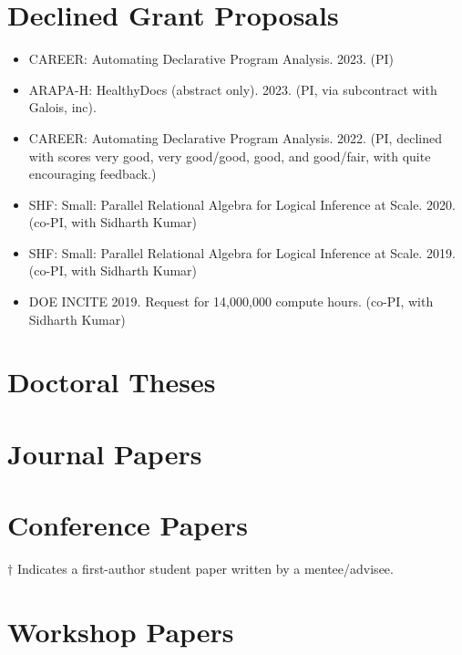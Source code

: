 \documentclass[line]{res}
\begin{document}
\begin{resume}
\section{\large Declined Grant Proposals} \vspace{0.5cm}

\begin{itemize}  
  \item
  CAREER: Automating Declarative Program Analysis. 2023. (PI) 
  \item
  ARAPA-H: HealthyDocs (abstract only). 2023. (PI, via subcontract with Galois, inc).
  \item
  CAREER: Automating Declarative Program Analysis. 2022. (PI, declined with scores very good, very good/good, good, and good/fair, with quite encouraging feedback.) 
  \item
  SHF: Small: Parallel Relational Algebra for Logical Inference at Scale. 2020. (co-PI, with Sidharth Kumar) 
  \item
  SHF: Small: Parallel Relational Algebra for Logical Inference at Scale. 2019. (co-PI, with Sidharth Kumar)
  \item
  DOE INCITE 2019. Request for 14,000,000 compute hours. (co-PI, with Sidharth Kumar)  
\end{itemize}

\section{\large Doctoral Theses} \vspace{0.3cm}

\vspace{-0.4cm}

\section{\large Journal Papers} \vspace{0.3cm}

\vspace{-0.4cm}

\section{\large Conference Papers} 
\indent $\dagger$ Indicates a first-author student paper written by a mentee/advisee.

\vspace{0.1cm}

\vspace{-0.4cm}

\section{\large Workshop Papers} \vspace{0.3cm}

\vspace{-0.4cm}


\end{resume}
\end{document}
